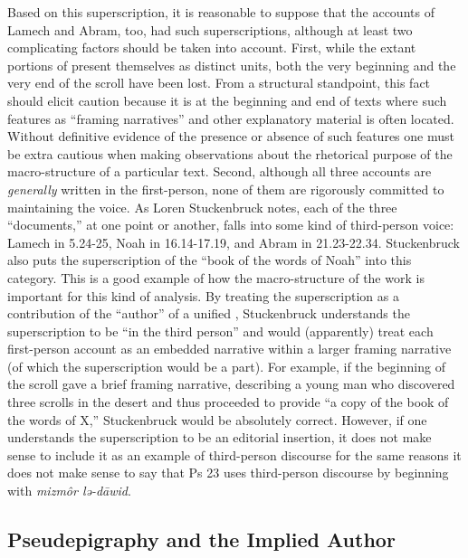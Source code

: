  Based on this superscription, it is reasonable to suppose that the accounts of Lamech and Abram, too, had such superscriptions, although at least two complicating factors should be taken into account. First, while the extant portions of \ga present themselves as distinct units, both the very beginning and the very end of the scroll have been lost. From a structural standpoint, this fact should elicit caution because it is at the beginning and end of texts where such features as ``framing narratives'' and other explanatory material is often located. Without definitive evidence of the presence or absence of such features one must be extra cautious when making observations about the rhetorical purpose of the macro-structure of a particular text. Second, although all three accounts are \emph{generally} written in the first-person, none of them are rigorously committed to maintaining the voice. As Loren Stuckenbruck notes, each of the three ``documents,'' at one point or another, falls into some kind of third-person voice: Lamech in 5.24-25, Noah in 16.14-17.19, and Abram in 21.23-22.34. Stuckenbruck also puts the superscription of the ``book of the words of Noah'' into this category. This is a good example of how the macro-structure of the work is important for this kind of analysis. By treating the superscription as a contribution of the ``author'' of a unified \ga, Stuckenbruck understands the superscription to be ``in the third person'' and would (apparently) treat each first-person account as an embedded narrative within a larger framing narrative (of which the superscription would be a part). For example, if the beginning of the scroll gave a brief framing narrative, describing a young man who discovered three scrolls in the desert and thus proceeded to provide ``a copy of the book of the words of X,'' Stuckenbruck would be absolutely correct. However, if one understands the superscription to be an editorial insertion, it does not make sense to include it as an example of third-person discourse for the same reasons it does not make sense to say that Ps 23 uses third-person discourse by beginning with \emph{mizmôr lə-dāwid}.\autocites[315--316]{stuckenbruck_roitman-etal2011}[See also][15--16. Even supposing a single author for \ga, as Stuckenbruck and others imply, I am still inclined to consider the superscriptions separately from the former examples because they would exist outside the frame of each embedded narrative.]{bernstein_chazon-etal1999}

 \hypertarget{pseudepigraphy-and-the-implied-author}{%
 \subsection{Pseudepigraphy and the Implied Author}\label{pseudepigraphy-and-the-implied-author}}


